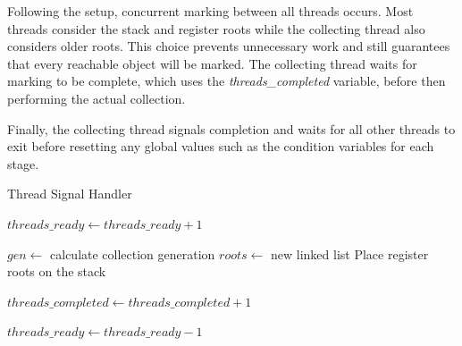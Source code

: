 \documentclass[../diss.tex]{subfiles}
\begin{document}
Following the setup, concurrent marking between all threads occurs. Most threads consider the stack and register roots while the collecting thread also considers older roots. This choice prevents unnecessary work and still guarantees that every reachable object will be marked. The collecting thread waits for marking to be complete, which uses the \emph{threads\_completed} variable, before then performing the actual collection.

Finally, the collecting thread signals completion and waits for all other threads to exit before resetting any global values such as the condition variables for each stage.

\begin{algorithm}
\caption{Thread Signal Handler}
\label{alg:threadssignalhandler}
\begin{algorithmic}


\State \Return
\EndIf

\State

\State {} 
\State $threads\_ready\gets threads\_ready + 1$
\State {}

\State

\State {} 

\State

\State $gen\gets$ calculate collection generation 
\State $roots\gets$ new linked list
\State Place register roots on the stack
\State {}
\State {}

\State
\State $threads\_completed\gets threads\_completed + 1$
\State {}

\State
{}
    \State {}
\EndWhile

\State

\State {} 
\State $threads\_ready\gets threads\_ready - 1$
\State {}

\State

\State {}

\EndFunction

\end{algorithmic}
\end{algorithm}
\end{document}
